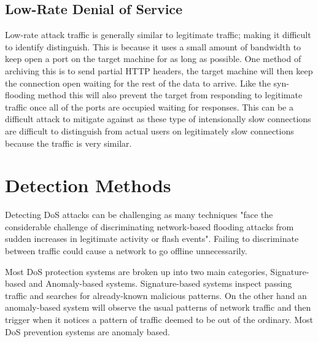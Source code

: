 \documentclass[conference, a4paper]{IEEEtran}
\begin{document}
\subsection{Low-Rate Denial of Service}
    Low-rate attack traffic is generally similar to legitimate traffic; making it difficult to identify distinguish.\cite{two_layer_approach__DDOS}
    This is because it uses a small amount of bandwidth to keep open a port on the target machine for as long as possible.
    One method of archiving this is to send partial HTTP headers, the target machine will then keep the connection open waiting for the rest of the data to arrive.
    Like the syn-flooding method this will also prevent the target from responding to legitimate traffic once all of the ports are occupied waiting for responses.
    This can be a difficult attack to mitigate against as these type of intensionally slow connections are difficult to distinguish from actual users on legitimately slow connections because the traffic is very similar.\cite{cloudflare_low_rate}

\section{Detection Methods}
    Detecting DoS attacks can be challenging as many techniques "face the considerable challenge of discriminating network-based flooding attacks from sudden increases in legitimate activity or flash events".\cite{detection_methods_2006}
    Failing to discriminate between traffic could cause a network to go offline unnecessarily.

    Most DoS protection systems are broken up into two main categories, Signature-based and Anomaly-based systems.
    Signature-based systems inspect passing traffic and searches for already-known malicious patterns.
    On the other hand an anomaly-based system will observe the usual patterns of network traffic and then trigger when it notices a pattern of traffic deemed to be out of the ordinary.
    Most DoS prevention systems are anomaly based.\cite{chnage_point_monitoring}
\end{document}

